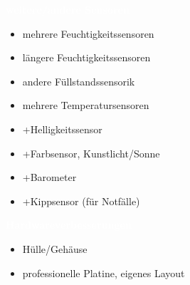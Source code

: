 \documentclass[bigger]{beamer}
\newcommand{\topic}[1]{{\huge{\textcolor{white}{\textbf{#1}}}}}
\begin{document}
\begin{frame}{\topic{weitere/andere Sensoren}}
	\begin{itemize}
		\item mehrere Feuchtigkeitssensoren
		\item längere Feuchtigkeitssensoren
		\item andere Füllstandssensorik
		\item mehrere Temperatursensoren
      	\item +Helligkeitssensor
		\item +Farbsensor, Kunstlicht/Sonne
		\item +Barometer
		\item +Kippsensor (für Notfälle)
	\end{itemize}
\end{frame}



\begin{frame}{\topic{Hardwareverbesserungen}}
	\begin{itemize}
		\item Hülle/Gehäuse
		\item professionelle Platine, eigenes Layout
	\end{itemize}
\end{frame}
\end{document}
